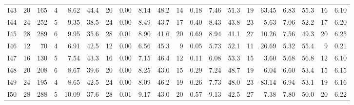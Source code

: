 \begin{landscape}
\begin{table}[p]
{\begin{tabular}{lrrr*{4}{rrrr}}
I43 & 20 & 165 & 4 & 8.62 & 44.4 & 20 & 0.00 & 8.14 & 48.2 & 14 & 0.18 & 7.46 & 51.3 & 19 & 63.45 & 6.83 & 55.3 & 16 & 6.10 \\
I44 & 24 & 252 & 5 & 9.35 & 38.5 & 24 & 0.00 & 8.49 & 43.7 & 17 & 0.40 & 8.43 & 43.8 & 23 & 5.63 & 7.06 & 52.2 & 17 & 6.20 \\
I45 & 28 & 289 & 6 & 9.95 & 35.6 & 28 & 0.01 & 8.90 & 41.6 & 20 & 0.69 & 8.94 & 41.1 & 27 & 10.26 & 7.56 & 49.3 & 20 & 6.25 \\
I46 & 12 & 70 & 4 & 6.91 & 42.5 & 12 & 0.00 & 6.56 & 45.3 & 9 & 0.05 & 5.73 & 52.1 & 11 & 26.69 & 5.32 & 55.4 & 9 & 0.21 \\
I47 & 16 & 130 & 5 & 7.54 & 43.3 & 16 & 0.00 & 7.15 & 46.4 & 12 & 0.11 & 6.08 & 53.3 & 15 & 3.60 & 5.68 & 56.8 & 12 & 6.10 \\
I48 & 20 & 208 & 6 & 8.67 & 39.6 & 20 & 0.00 & 8.25 & 43.0 & 15 & 0.29 & 7.24 & 48.7 & 19 & 6.04 & 6.60 & 53.4 & 15 & 6.15 \\
I49 & 24 & 195 & 4 & 8.65 & 42.5 & 24 & 0.00 & 8.09 & 46.2 & 19 & 0.26 & 7.73 & 48.0 & 23 & 83.14 & 6.94 & 53.1 & 19 & 6.16 \\
I50 & 28 & 288 & 5 & 10.09 & 37.6 & 28 & 0.01 & 9.17 & 43.0 & 20 & 0.57 & 9.13 & 42.5 & 27 & 7.38 & 7.80 & 50.0 & 20 & 6.22 \\
\bottomrule
\end{tabular}%
}
\endgroup
\end{table}
\end{landscape}
